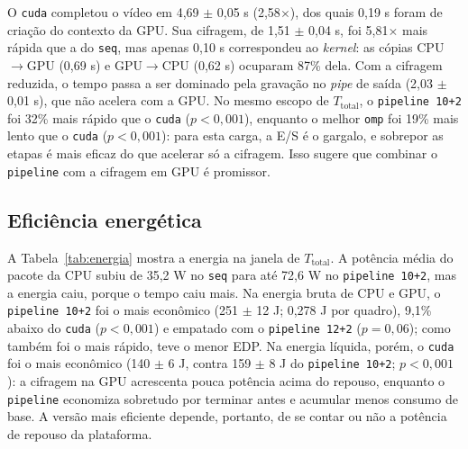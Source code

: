 \documentclass[12pt]{article}
\begin{document}
O \texttt{cuda} completou o vídeo em 4,69 $\pm$ 0,05 s (2,58$\times$), dos
quais 0,19 s foram de criação do contexto da GPU. Sua cifragem, de
1,51 $\pm$ 0,04 s, foi 5,81$\times$ mais rápida que a do \texttt{seq}, mas
apenas 0,10 s correspondeu ao \textit{kernel}: as cópias CPU$\to$GPU
(0,69 s) e GPU$\to$CPU (0,62 s) ocuparam 87\% dela. Com a cifragem reduzida, o
tempo passa a ser dominado pela gravação no \textit{pipe} de saída
(2,03 $\pm$ 0,01 s), que não acelera com a GPU. No mesmo escopo de
$T_{\mathrm{total}}$, o \texttt{pipeline 10+2} foi 32\% mais rápido que o
\texttt{cuda} ($p < 0{,}001$), enquanto o melhor \texttt{omp} foi 19\% mais
lento que o \texttt{cuda} ($p < 0{,}001$): para esta carga, a E/S é o gargalo, e sobrepor as etapas é mais
eficaz do que acelerar só a cifragem. Isso sugere que combinar o
\texttt{pipeline} com a cifragem em GPU é promissor.

\subsection{Eficiência energética}

A Tabela~\ref{tab:energia} mostra a energia na janela de $T_{\mathrm{total}}$.
A potência média do pacote da CPU subiu de 35,2 W no \texttt{seq} para até
72,6 W no \texttt{pipeline 10+2}, mas a energia caiu, porque o tempo caiu mais.
Na energia bruta de CPU e GPU, o \texttt{pipeline 10+2} foi o mais econômico
(251 $\pm$ 12 J; 0,278 J por quadro), 9,1\% abaixo do \texttt{cuda}
($p < 0{,}001$) e empatado com o \texttt{pipeline 12+2} ($p = 0{,}06$); como
também foi o mais rápido, teve o menor EDP. Na energia líquida, porém, o
\texttt{cuda} foi o mais econômico (140 $\pm$ 6 J, contra 159 $\pm$ 8 J do
\texttt{pipeline 10+2}; $p < 0{,}001$): a cifragem na GPU acrescenta pouca
potência acima do repouso, enquanto o \texttt{pipeline} economiza sobretudo por
terminar antes e acumular menos consumo de base. A versão mais eficiente
depende, portanto, de se contar ou não a potência de repouso da plataforma.
\end{document}
